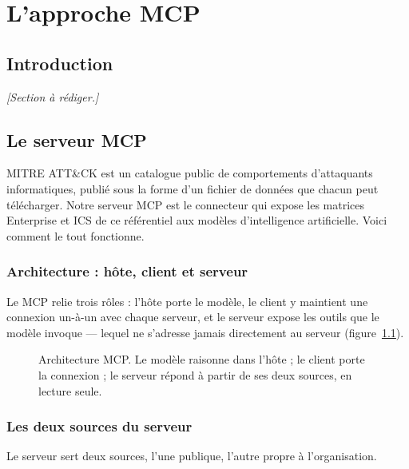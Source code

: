 \chapter{L'approche MCP}\label{chap:approche-mcp}

\section{Introduction}\label{sec:ch2-1}

\emph{[Section à rédiger.]}

\section{Le serveur MCP}\label{sec:ch2-2}

MITRE ATT\&CK est un catalogue public de comportements d'attaquants informatiques, publié sous la forme d'un fichier de données que chacun peut télécharger. Notre serveur MCP est le connecteur qui expose les matrices Enterprise et ICS de ce référentiel aux modèles d'intelligence artificielle. Voici comment le tout fonctionne.

\subsection{Architecture : hôte, client et serveur}\label{sec:ch2-2-1}

Le MCP relie trois rôles : l'hôte porte le modèle, le client y maintient une connexion un-à-un avec chaque serveur, et le serveur expose les outils que le modèle invoque --- lequel ne s'adresse jamais directement au serveur (figure~\ref{fig:ch2-archi}).

\begin{figure}[htbp]
\centering
{}
\caption{Architecture MCP. Le modèle raisonne dans l'hôte ; le client porte la connexion ; le serveur répond à partir de ses deux sources, en lecture seule.}\label{fig:ch2-archi}
\end{figure}

\subsection{Les deux sources du serveur}\label{sec:ch2-2-2}

Le serveur sert deux sources, l'une publique, l'autre propre à l'organisation.

